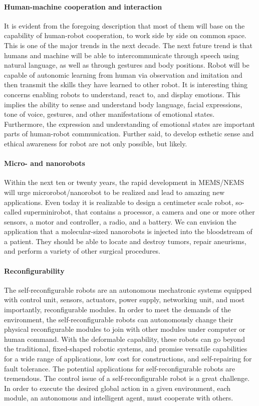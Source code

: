 \documentclass[a4paper,12pt,twoside]{report}
\begin{document}
{			\paragraph{Human-machine cooperation and interaction} {It is evident from the foregoing description that most of them will base on the capability of human-robot cooperation, to work side by side on common space. This is one of the major trends in the next decade. The next future trend is that humans and machine will be able to intercommunicate through speech using natural language, as well as through gestures and body positions. Robot will be capable of autonomic learning from human via observation and imitation and then transmit the skills they have learned to other robot.
			It is interesting thing concerns enabling robots to understand, react to, and display emotions. This implies the ability to sense and understand body language, facial expressions, tone of voice, gestures, and other manifestations of emotional states. Furthermore, the expression and understanding of emotional states are important parts of human-robot communication. Further said, to develop esthetic sense and ethical awareness for robot are not only possible, but likely. \cite{AReviewOfMechatronicsAndBioInspiredMechatronicsSystem:Luoa2008}
			}
			\paragraph{Micro- and nanorobots} {Within the next ten or twenty years, the rapid development in MEMS/NEMS will urge microrobot/nanorobot to be realized and lead to amazing new applications. Even today it is realizable to design a centimeter scale robot, so-called superminirobot, that contains a processor, a camera and one or more other sensors, a motor and controller, a radio, and a battery. We can envision the application that a molecular-sized nanorobots is injected into the bloodstream of a patient. They should be able to locate and destroy tumors, repair aneurisms, and perform a variety of other surgical procedures. 	\cite{AReviewOfMechatronicsAndBioInspiredMechatronicsSystem:Luoa2008}
			}
			\paragraph{Reconfigurability} {The self-reconfigurable robots are an autonomous mechatronic systems equipped with control unit, sensors, actuators, power supply, networking unit, and most importantly, reconfigurable modules. In order to meet the demands of the environment, the self-reconfigurable robots can autonomously change their physical reconfigurable modules to join with other modules under computer or human command. With the deformable capability, these robots can go beyond the traditional, fixed-shaped robotic systems, and promise versatile capabilities for a wide range of applications, low cost for constructions, and self-repairing for fault tolerance. The potential applications for self-reconfigurable robots are tremendous. The control issue of a self-reconfigurable robot is a great challenge. In order to execute the desired global action in a given environment, each module, an autonomous and intelligent agent, must cooperate with others. \cite{AReviewOfMechatronicsAndBioInspiredMechatronicsSystem:Luoa2008}			
			}
}
\end{document}
